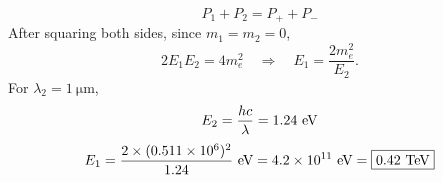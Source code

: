 \begin{equation}
  P_1 + P_2 = P_{+} + P_{-}
\end{equation}
After squaring both sides, since $m_1=m_2=0$,
\begin{equation}
  2E_1E_2 = 4m_e^2 \quad \Rightarrow \quad E_1 = \frac{2m_e^2}{E_2}.
\end{equation}
%
For $\lambda_2 = \SI{1}{\micro\meter}$,
\begin{equation}
  E_2 = \frac{hc}{\lambda} = 1.24~\text{eV}
\end{equation}
\begin{equation}
  E_1 = \frac{2\times (0.511\times 10^6)^2}{1.24} ~\text{eV}
      = 4.2\times 10^{11} ~\text{eV} = \boxed{ 0.42 ~\text{TeV} }
\end{equation}


